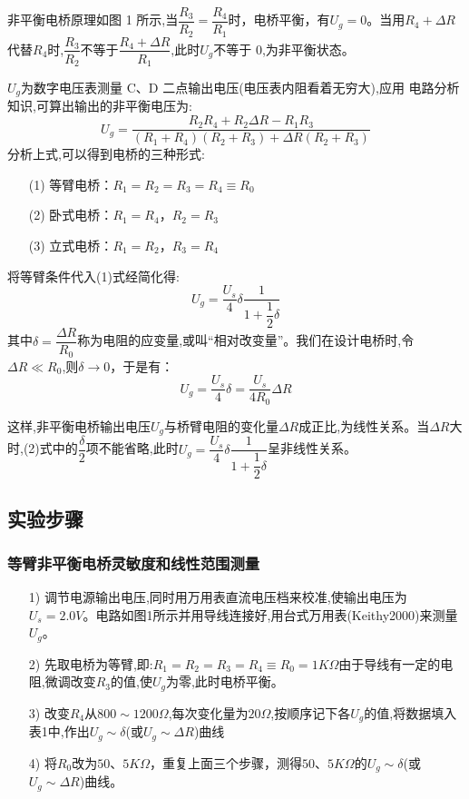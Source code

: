 \documentclass[UEF8]{ctexart}
\begin{document}
\begin{multicols}{2}
 非平衡电桥原理如图 1 所示,当$\dfrac{R_{3}}{R_{2}}=\dfrac{R_{4}}{R_{1}}$时，电桥平衡，有$U_{g}=0$。当用$R_{4}+\Delta{R}$代替$R_{4}$时,$\dfrac{R_{3}}{R_{2}}$不等于$\dfrac{R_{4}+\Delta{R}}{R_{1}}$,此时$U_{g}$不等于 0,为非平衡状态。
 
 
$U_{g}$为数字电压表测量 C、D 二点输出电压(电压表内阻看着无穷大),应用
电路分析知识,可算出输出的非平衡电压为:
\begin{equation}
U_{g}=\dfrac{R_{2}R_{4}+R_{2}\Delta{R}-R_{1}R_{3}}{(R_{1}+R_{4})(R_{2}+R_{3})+\Delta{R}(R_{2}+R_{3})} \tag{1}
\end{equation}
分析上式,可以得到电桥的三种形式:
\begin{enumerate}
 	\item[(1)]等臂电桥：$R_{1}=R_{2}=R_{3}=R_{4}\equiv{R_{0}}$
 	\item[(2)]卧式电桥：$R_{1}=R_{4}$，$R_{2}=R_{3}$
 	\item[(3)]立式电桥：$R_{1}=R_{2}$，$R_{3}=R_{4}$
\end{enumerate}
将等臂条件代入(1)式经简化得:
\begin{equation}
U_{g}=\dfrac{U_{s}}{4}\delta\dfrac{1}{1+\dfrac{1}{2}\delta} \tag{2}
\end{equation}
其中$\delta=\dfrac{\Delta{R}}{R_{0}}$称为电阻的应变量,或叫“相对改变量”。我们在设计电桥时,令$\Delta{R}\ll{R_{0}}$,则$\delta\to{0}$，于是有：
\begin{equation}
U_{g}=\dfrac{U_{s}}{4}\delta=\dfrac{U_{s}}{4R_{0}}\Delta{R} \tag{3}
\end{equation}
 
 这样,非平衡电桥输出电压$U_{g}$与桥臂电阻的变化量$\Delta{R}$成正比,为线性关系。当$\Delta{R}$大时,(2)式中的$\dfrac{\delta}{2}$项不能省略,此时$U_{g}=\dfrac{U_{s}}{4}\delta\dfrac{1}{1+\dfrac{1}{2}\delta}$呈非线性关系。


\subsection{实验步骤}
\subsubsection{等臂非平衡电桥灵敏度和线性范围测量}
\begin{enumerate}	
	\item[1)] 调节电源输出电压,同时用万用表直流电压档来校准,使输出电压为
	$U_{s}=2.0V$。电路如图1所示并用导线连接好,用台式万用表(Keithy2000)来测量$U_{g}$。
	\item[2)]
	先取电桥为等臂,即:$R_{1}=R_{2}=R_{3}=R_{4}\equiv{R_{0}}=1K\Omega$由于导线有一定的电阻,微调改变$R_{3}$的值,使$U_{g}$为零,此时电桥平衡。
	\item[3)]改变$R_{4}$从$800\sim1200\Omega$,每次变化量为$20\Omega$,按顺序记下各$U_{g}$的值,将数据填入表1中,作出$U_{g}\sim\delta$(或$U_{g}\sim\Delta{R}$)曲线
	\item[4)]将$R_{0}$改为$50、5K\Omega$，重复上面三个步骤，测得$50、5K\Omega$的$U_{g}\sim\delta$(或$U_{g}\sim\Delta{R}$)曲线。
\end{enumerate}


\end{multicols}
\end{document}
